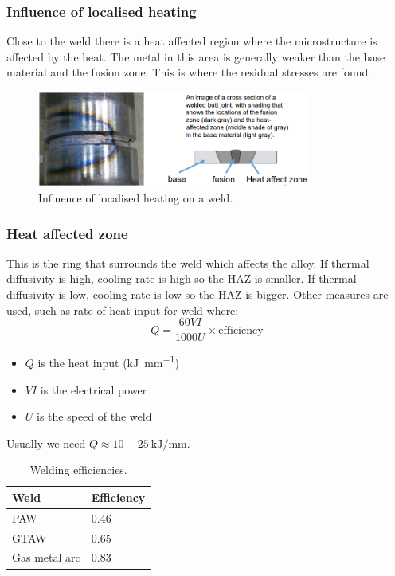 \subsubsection{Influence of localised heating}
Close to the weld there is a heat affected region where the microstructure is affected by the heat. The metal in this area is generally weaker than the base material and the fusion zone. This is where the residual stresses are found.
\begin{figure}[H]
    \centering
    \includegraphics[width = 0.8\textwidth]{img/figure48.png}
    \caption{Influence of localised heating on a weld.}
\end{figure}
\subsubsection{Heat affected zone}
This is the ring that surrounds the weld which affects the alloy. If thermal diffusivity is high, cooling rate is high so the HAZ is smaller. If thermal diffusivity is low, cooling rate is low so the HAZ is bigger. Other measures are used, such as rate of heat input for weld where:
\begin{equation}
    Q = \frac{60VI}{1000U}\times \textrm{efficiency}
\end{equation}
\begin{itemize}
    \item $Q$ is the heat input (\si{\kilo\joule\per\milli\meter})
    \item $VI$ is the electrical power
    \item $U$ is the speed of the weld
\end{itemize}
Usually we need $Q \approx 10-\SI{25}{\kilo\joule\per\milli\meter}$.
\begin{table}[H]
    \centering
    \begin{tabular}{@{}ll@{}}
        \toprule
        \textbf{Weld} & \textbf{Efficiency} \\
        \midrule
        PAW           & 0.46                \\
        GTAW          & 0.65                \\
        Gas metal arc & 0.83                \\
        \bottomrule
    \end{tabular}
    \caption{Welding efficiencies.}
\end{table}
